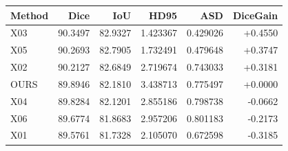 \begin{tabular}{lrrrrr}
\hline
Method & Dice & IoU & HD95 & ASD & DiceGain \\
\hline
X03 & 90.3497 & 82.9327 & 1.423367 & 0.429026 & +0.4550 \\
X05 & 90.2693 & 82.7905 & 1.732491 & 0.479648 & +0.3747 \\
X02 & 90.2127 & 82.6849 & 2.719674 & 0.743033 & +0.3181 \\
OURS & 89.8946 & 82.1810 & 3.438713 & 0.775497 & +0.0000 \\
X04 & 89.8284 & 82.1201 & 2.855186 & 0.798738 & -0.0662 \\
X06 & 89.6774 & 81.8683 & 2.957206 & 0.801183 & -0.2173 \\
X01 & 89.5761 & 81.7328 & 2.105070 & 0.672598 & -0.3185 \\
\hline
\end{tabular}
